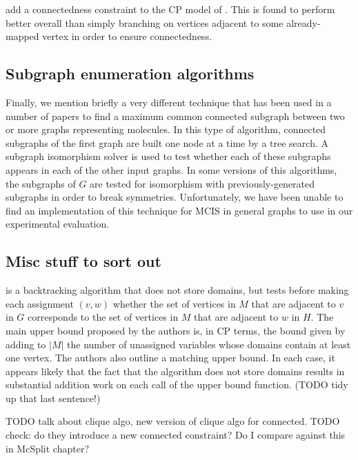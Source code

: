 \cite{DBLP:conf/cp/McCreeshNPS16} add a connectedness constraint to
the CP model of \citet{DBLP:conf/cp/NdiayeS11}.  This is found to perform
better overall than simply branching on vertices adjacent to some already-mapped
vertex in order to ensure connectedness.

\subsection{Subgraph enumeration algorithms}

Finally, we mention briefly a very different technique that has been used
in a number of papers to find a maximum common connected subgraph between two or more
graphs representing molecules.
\citep{armitage1967automatic}
\citep{takahashi1987recognition}
\citep{DBLP:journals/jcheminf/DalkeH13}
In this type of algorithm, connected
subgraphs of the first graph are built one node at a time by a tree search.
A subgraph isomorphism solver is used to test whether each of these subgraphs
appears in each of the other input graphs.  In some versions of this algorithms,
the subgraphs of $G$ are tested for isomorphism with previously-generated subgraphs
in order to break symmetries.
Unfortunately, we have been unable to find an implementation of this technique
for MCIS in general graphs to use in our experimental evaluation.

\subsection{Misc stuff to sort out}

\citet{cao2008maximum} is a backtracking algorithm that does not store domains,
but tests before making each assignment $(v,w)$ whether the set of vertices in $M$
that are adjacent to $v$ in $G$ corresponds to the set of vertices in $M$ that
are adjacent to $w$ in $H$.  The main upper bound proposed by the authors
is, in CP terms, the bound given by adding to $|M|$ the number of unassigned
variables whose domains contain at least one vertex.  The authors also outline
a matching upper bound.  In each case, it appears likely that the fact that the algorithm does not
store domains results in substantial addition work on each call of the upper bound
function.  (TODO tidy up that last sentence!)

\citet{DBLP:conf/cp/McCreeshNPS16} TODO talk about clique algo, new version
of clique algo for connected. TODO check: do they introduce a new connected
constraint? Do I compare against this in McSplit chapter?


